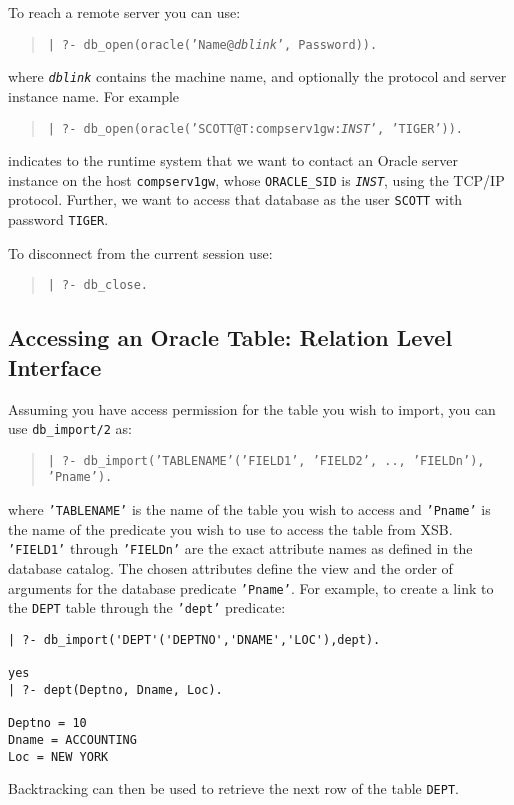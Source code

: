 To reach a remote server you can use:
\begin{quote}
	{\tt  | ?- db\_open(oracle('Name@\emph{dblink}', Password)).}
\end{quote}
where {\tt \emph{dblink}} contains the machine name, and optionally
the protocol and server instance name.  For example
\begin{quote}
 {\tt | ?- db\_open(oracle('SCOTT@T:compserv1gw:\emph{INST}', 'TIGER')).}
\end{quote}
indicates to the runtime system that we want to contact an Oracle
server instance on the host {\tt compserv1gw}, whose {\tt ORACLE\_SID}
is {\tt \emph{INST}}, using the TCP/IP protocol.  Further, we want to
access that database as the user \texttt{SCOTT} with password
\texttt{TIGER}.

To disconnect from the current session use:
\begin{quote}
{\tt  | ?- db\_close.}
\end{quote}


\subsection{Accessing an Oracle Table: Relation Level Interface}
\label{sec:oracle:rellevel}

Assuming you have access permission for the table you wish to import,
you can use {\tt db\_import/2} as:
\begin{quote}
{\tt | ?- db\_import('TABLENAME'('FIELD1', 'FIELD2', .., 'FIELDn'), 'Pname').}
\end{quote}
where {\tt 'TABLENAME'} is the name of the table you wish to access
and {\tt 'Pname'} is the name of the predicate you wish to use to
access the table from XSB. {\tt 'FIELD1'} through {\tt 'FIELDn'} are
the exact attribute names as defined in the database catalog.  The
chosen attributes define the view and the order of arguments for the
database predicate {\tt 'Pname'}.  For example, to create a link to
the {\tt DEPT} table through the {\tt 'dept'} predicate:
\begin{verbatim}
| ?- db_import('DEPT'('DEPTNO','DNAME','LOC'),dept).

yes
| ?- dept(Deptno, Dname, Loc).

Deptno = 10
Dname = ACCOUNTING
Loc = NEW YORK 
\end{verbatim}

Backtracking can then be used to retrieve the next row of the table {\tt DEPT}.

